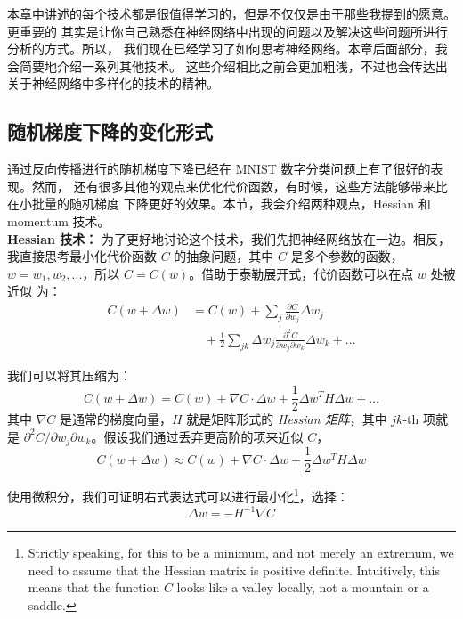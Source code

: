 本章中讲述的每个技术都是很值得学习的，但是不仅仅是由于那些我提到的愿意。更重要的
其实是让你自己熟悉在神经网络中出现的问题以及解决这些问题所进行分析的方式。所以，
我们现在已经学习了如何思考神经网络。本章后面部分，我会简要地介绍一系列其他技术。
这些介绍相比之前会更加粗浅，不过也会传达出关于神经网络中多样化的技术的精神。

\subsection{随机梯度下降的变化形式}

通过反向传播进行的随机梯度下降已经在 MNIST 数字分类问题上有了很好的表现。然而，
还有很多其他的观点来优化代价函数，有时候，这些方法能够带来比在小批量的随机梯度
下降更好的效果。本节，我会介绍两种观点，Hessian 和 momentum 技术。
\\

\textbf{Hessian 技术：} 为了更好地讨论这个技术，我们先把神经网络放在一边。相反，
我直接思考最小化代价函数 $C$ 的抽象问题，其中 $C$ 是多个参数的函数，
$w=w_1,w_2,...$，所以 $C=C(w)$。借助于泰勒展开式，代价函数可以在点 $w$ 处被近似
为：
\begin{align}
  C(w+\Delta w) &= C(w) + \sum_j \frac{\partial C}{\partial w_j} \Delta w_j \nonumber \\
     & \quad + \frac{1}{2} \sum_{jk} \Delta w_j \frac{\partial^2 C}{\partial w_j \partial w_k} \Delta w_k + \ldots \label{eq:103}\tag{103}
\end{align}

我们可以将其压缩为：
\begin{equation}
  C(w+\Delta w) = C(w) + \nabla C \cdot \Delta w +
  \frac{1}{2} \Delta w^T H \Delta w + \ldots
  \label{eq:104}\tag{104}
\end{equation}
其中 $\nabla C$ 是通常的梯度向量，$H$ 就是矩阵形式的 \emph{Hessian 矩阵}，其中 $jk$-th
项就是 $\partial^2 C/\partial w_j\partial w_k$。假设我们通过丢弃更高阶的项来近似
$C$，
\begin{equation} 
  C(w+\Delta w) \approx C(w) + \nabla C \cdot \Delta w +
  \frac{1}{2} \Delta w^T H \Delta w
  \label{eq:105}\tag{105}
\end{equation}

使用微积分，我们可证明右式表达式可以进行最小化\footnote{Strictly speaking, for this to be a minimum, and not merely an extremum, we need to assume that the Hessian matrix is positive definite. Intuitively, this means that the function $C$
 looks like a valley locally, not a mountain or a saddle.}，选择：
\begin{equation}
  \Delta w = -H^{-1} \nabla C
  \label{eq:106}\tag{106}
\end{equation}

